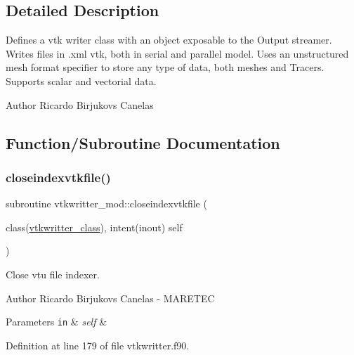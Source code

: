 \subsection{Detailed Description}
Defines a vtk writer class with an object exposable to the Output streamer. Writes files in .xml vtk, both in serial and parallel model. Uses an unstructured mesh format specifier to store any type of data, both meshes and Tracers. Supports scalar and vectorial data. 

\begin{DoxyAuthor}{Author}
Ricardo Birjukovs Canelas 
\end{DoxyAuthor}


\subsection{Function/\+Subroutine Documentation}
\mbox{\label{namespacevtkwritter__mod_a6f9a731d9dee5651f85d4aeed3f3ea5d}} 
\subsubsection{\texorpdfstring{closeindexvtkfile()}{closeindexvtkfile()}}
{\footnotesize\ttfamily subroutine vtkwritter\+\_\+mod\+::closeindexvtkfile (\begin{DoxyParamCaption}\item[{class(\mbox{\hyperlink{structvtkwritter__mod_1_1vtkwritter__class}{vtkwritter\+\_\+class}}), intent(inout)}]{self }\end{DoxyParamCaption})\hspace{0.3cm}{\ttfamily [private]}}



Close vtu file indexer. 

\begin{DoxyAuthor}{Author}
Ricardo Birjukovs Canelas -\/ M\+A\+R\+E\+T\+EC 
\end{DoxyAuthor}

\begin{DoxyParams}[1]{Parameters}
\mbox{\tt in}  & {\em self} & \\
\hline
\end{DoxyParams}


Definition at line 179 of file vtkwritter.\+f90.



